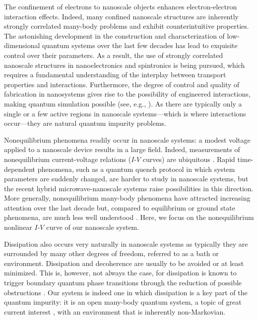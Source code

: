 \documentclass[aps,prb,reprint,floatfix,superscriptaddress,amssymb,amsmath]{revtex4-2}
\newcommand{\hub}[1]{\textcolor{red}{#1}}
\begin{document}
The confinement of electrons to nanoscale objects enhances electron-electron interaction effects.  Indeed, many confined nanoscale structures are inherently strongly correlated many-body problems and exhibit counterintuitive properties. 
The astonishing development in the construction and characterization of low-dimensional quantum systems over the last few decades has lead to exquisite control over their parameters. 
As a result, the use of strongly correlated nanoscale structures in nanoelectronics and spintronics is being pursued, which requires a fundamental understanding of the interplay between transport properties and interactions. 
Furthermore, the degree of control and quality of fabrication in nanosystems gives rise to the possibility of engineered interactions, making quantum simulation possible (see, e.g., 
\cite{DesjardinsKontosNature17, AnthorePierrePRX18, VandersypenNagFerroNature20, LevySerpentineSciAdv20, Frolov3AndreevX21, Veldhorst2DarrayAPL21}).   
As there are typically only a single or a few active regions in nanoscale systems---which is where interactions occur---they are natural quantum impurity problems. 

Nonequilibrium phenomena readily occur in nanoscale systems: a modest voltage applied to a nanoscale device results in a large field.  Indeed, measurements of nonequilibrium current-voltage relations ($I$-$V$ curves) are ubiquitous \cite{IhnBook}.  
Rapid time-dependent phenomena, such as a quantum quench protocol in which system parameters are suddenly changed, are harder to study in nanoscale systems, but the recent hybrid microwave-nanoscale systems raise possibilities in this direction.
More generally, nonequilibrium many-body phenomena have attracted increasing attention over the last decade but, compared to equilibrium or ground state phenomena, are much less well understood \cite{CarrBook, PolkovnikovNoneqClosedRMP11, NoneqDMFT-RMP14, EisertNoneqreviewNatP15, LeHurDrivenQImpReviewCRP18, RylandsNoneqIntegrable20}. Here, we focus on the nonequilibrium nonlinear $I$-$V$ curve of our nanoscale system. 

Dissipation also occurs very naturally in nanoscale systems as typically they are surrounded by many other degrees of freedom, referred to as a bath or environment. Dissipation and decoherence are usually to be avoided or at least minimized.
This is, however, not always the case, for dissipation is known to trigger boundary quantum phase transitions through the reduction of possible obstructions \cite{Mebrahtu12,Zhangdiss2IK17}.
Our system is indeed one in which
dissipation is a key part of the quantum impurity: it is an open many-body quantum system, a topic of great current interest \cite{BreuerPetruccioneBook, deVegaAlonsoRMP17}, with an environment that is inherently non-Markovian.
\end{document}
